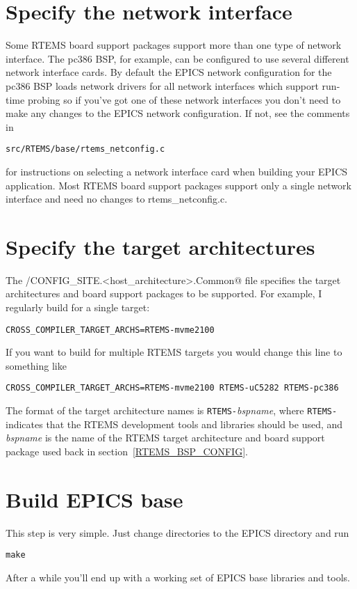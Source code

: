 \documentclass{report}
\begin{document}
\section{Specify the network interface}
Some RTEMS board support packages support more than one type of network interface.
The pc386 BSP, for example, can be configured to use several different
network interface cards.  By default the EPICS network configuration for
the pc386 BSP loads network drivers for all network interfaces which
support run-time probing so if you've got one of these network interfaces you
don't need to make any changes to the EPICS network configuration.
If not, see the comments in
\begin{alltt}
src/RTEMS/base/rtems_netconfig.c
\end{alltt}
for instructions on selecting a network interface card when building your
EPICS application.  
Most RTEMS board support packages support only a single network interface and
need no changes to rtems\_netconfig.c.

\section{Specify the target architectures}
The \verb@configure/CONFIG_SITE.<host_architecture>.Common@ file specifies the target
architectures and board support packages to be supported.
For example, I regularly build for a single target:
\begin{verbatim}
CROSS_COMPILER_TARGET_ARCHS=RTEMS-mvme2100
\end{verbatim}
If you want to build for multiple RTEMS targets you would change
this line to something like
\begin{verbatim}
CROSS_COMPILER_TARGET_ARCHS=RTEMS-mvme2100 RTEMS-uC5282 RTEMS-pc386
\end{verbatim}
The format of the target architecture names is {\tt RTEMS-}{\it bspname}, where
{\tt RTEMS-} indicates that the RTEMS development tools and libraries should
be used, and
{\it bspname} is the name of the RTEMS target architecture and
board support package used back in section~\ref{RTEMS_BSP_CONFIG}.


\section{Build EPICS base}
This step is very simple.  Just change directories to the EPICS \verb@base@ directory
and run
\begin{verbatim}
make
\end{verbatim}
After a while you'll end up with a working set of EPICS base libraries and tools.
\end{document}
